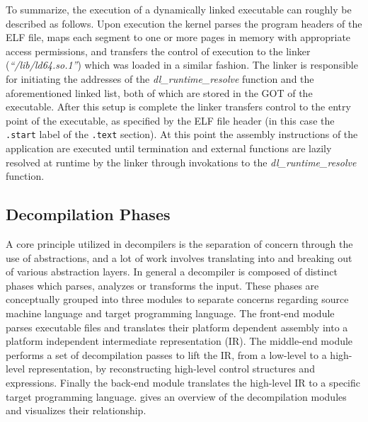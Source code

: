 To summarize, the execution of a dynamically linked executable can roughly be described as follows. Upon execution the kernel parses the program headers of the ELF file, maps each segment to one or more pages in memory with appropriate access permissions, and transfers the control of execution to the linker (\textit{``/lib/ld64.so.1''}) which was loaded in a similar fashion. The linker is responsible for initiating the addresses of the \textit{dl\_runtime\_resolve} function and the aforementioned linked list, both of which are stored in the GOT of the executable. After this setup is complete the linker transfers control to the entry point of the executable, as specified by the ELF file header (in this case the \texttt{.start} label of the \texttt{.text} section). At this point the assembly instructions of the application are executed until termination and external functions are lazily resolved at runtime by the linker through invokations to the \textit{dl\_runtime\_resolve} function.


\subsection{Decompilation Phases}

A core principle utilized in decompilers is the separation of concern through the use of abstractions, and a lot of work involves translating into and breaking out of various abstraction layers. In general a decompiler is composed of distinct phases which parses, analyzes or transforms the input. These phases are conceptually grouped into three modules to separate concerns regarding source machine language and target programming language. The front-end module parses executable files and translates their platform dependent assembly into a platform independent intermediate representation (IR). The middle-end module performs a set of decompilation passes to lift the IR, from a low-level to a high-level representation, by reconstructing high-level control structures and expressions. Finally the back-end module translates the high-level IR to a specific target programming language.  gives an overview of the decompilation modules and visualizes their relationship.

